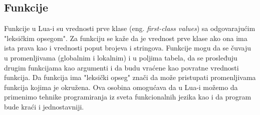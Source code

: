 \documentclass[a4paper]{article}
\begin{document}
\subsection{Funkcije}
\label{sec:funkcije}

Funkcije u Lua-i su vrednosti prve klase (eng. \textit{first-class values}) sa odgovarajućim "leksičkim opsegom". Za funkciju se kaže da je vrednost prve klase ako ona ima ista prava kao i vrednosti poput brojeva i stringova. Funkcije mogu da se čuvaju u promenljivama (globalnim i lokalnim) i u poljima tabela, da se prosleđuju drugim funkcijama kao argumenti i da budu vraćene kao povratne vrednosti funkcija. Da funkcija ima "leksički opseg" znači da može pristupati promenljivama funkcija kojima je okružena. Ova osobina omogućava da u Lua-i možemo da primenimo tehnike programiranja iz sveta funkcionalnih jezika kao i da program bude kraći i jednostavniji.
\end{document}
